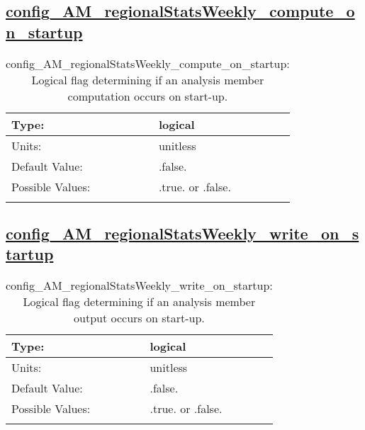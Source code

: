 \subsection[config\_AM\_regionalStatsWeekly\_compute\_on\_startup]{\hyperref[sec:nm_tab_AM_regionalStatsWeekly]{config\_AM\_regionalStatsWeekly\_compute\_on\_startup}}
\label{subsec:nm_sec_config_AM_regionalStatsWeekly_compute_on_startup}
\begin{center}
\begin{longtable}{| p{2.0in} || p{4.0in} |}
    \hline
    Type: & logical \\
    \hline
    Units: & \si{unitless} \\
    \hline
    Default Value: & .false. \\
    \hline
    Possible Values: & .true. or .false. \\
    \hline
    \caption{config\_AM\_regionalStatsWeekly\_compute\_on\_startup: Logical flag determining if an analysis member computation occurs on start-up.}
\end{longtable}
\end{center}
\subsection[config\_AM\_regionalStatsWeekly\_write\_on\_startup]{\hyperref[sec:nm_tab_AM_regionalStatsWeekly]{config\_AM\_regionalStatsWeekly\_write\_on\_startup}}
\label{subsec:nm_sec_config_AM_regionalStatsWeekly_write_on_startup}
\begin{center}
\begin{longtable}{| p{2.0in} || p{4.0in} |}
    \hline
    Type: & logical \\
    \hline
    Units: & \si{unitless} \\
    \hline
    Default Value: & .false. \\
    \hline
    Possible Values: & .true. or .false. \\
    \hline
    \caption{config\_AM\_regionalStatsWeekly\_write\_on\_startup: Logical flag determining if an analysis member output occurs on start-up.}
\end{longtable}
\end{center}
